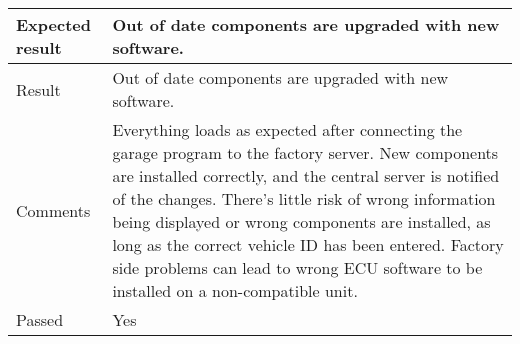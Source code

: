 \begin{table}[H]
\begin{tabularx}{1.0\textwidth}{
    |p{}     %
    |p{}|    %
}
Expected result
& Out of date components are upgraded with new software.
\\
\hline

Result
& Out of date components are upgraded with new software.
\\
\hline

Comments
& Everything loads as expected after connecting the garage program to the factory server. New components are installed correctly, and the central server is notified of the changes. There's little risk of wrong information being displayed or wrong components are installed, as long as the correct vehicle ID has been entered. Factory side problems can lead to wrong ECU software to be installed on a non-compatible unit.
\\
\hline

Passed
& Yes
\\
\hline

\end{tabularx}
\end{table}


